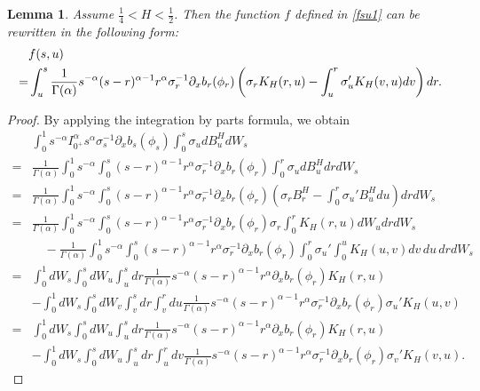 \documentclass[preprint,12pt]{elsarticle}
\newtheorem{lemma}[theorem]{Lemma}
\theoremstyle{definition}  %
\theoremstyle{plain}  %
\begin{document}
\begin{lemma}
 Assume $\tfrac{1}{4} < H < \tfrac{1}{2}$. Then the function $f$ defined in \eqref{fsu1} can be rewritten in the following form:
 \begin{align}
  \notag    &f(s,u)\\
      =&\int_u^s  \frac{1}{\Gamma(\alpha)} s^{-\alpha}  (s-r)^{\alpha-1} r^{\alpha} \sigma_r^{-1}\partial_x b_r(\phi_r)\left( \sigma_r  K_H(r,u) -\int_u^r \sigma_u' K_H(v,u)dv   \right)dr. \label{fsu}
 \end{align}
\end{lemma}
\begin{proof}
 By applying the integration by parts formula, we obtain
  \begin{align*}
    & \int_0^1 s^{-\alpha}I_{0^+}^\alpha s^{\alpha} \sigma_s^{-1}\partial_x b_s(\phi_s)\int_0^s \sigma_u dB^H_u    dW_s  \\
      =& \frac{1}{\Gamma(\alpha)}\int_0^1 s^{-\alpha} \int_0^s (s-r)^{\alpha-1} r^{\alpha} \sigma_r^{-1}\partial_x b_r(\phi_r)\int_0^r \sigma_u dB^H_u  dr dW_s \\
      =& \frac{1}{\Gamma(\alpha)}\int_0^1 s^{-\alpha} \int_0^s (s-r)^{\alpha-1} r^{\alpha} \sigma_r^{-1}\partial_x b_r(\phi_r)\left( \sigma_r B^H_r-\int_0^r \sigma_u' B^H_u du\right) drdW_s\\
       =& \frac{1}{\Gamma(\alpha)}\int_0^1 s^{-\alpha} \int_0^s (s-r)^{\alpha-1} r^{\alpha} \sigma_r^{-1}\partial_x b_r(\phi_r) \sigma_r \int_0^r K_H(r,u)dW_u drdW_s\\
       &\quad  - \frac{1}{\Gamma(\alpha)}\int_0^1 s^{-\alpha} \int_0^s (s-r)^{\alpha-1} r^{\alpha} \sigma_r^{-1}\partial_x b_r(\phi_r) \int_0^r \sigma_u'\int_0^u K_H(u,v)dv\,du\,drdW_s\\
       =&\int_0^1 dW_s\int_0^s dW_u \int_u^s dr  \frac{1}{\Gamma(\alpha)} s^{-\alpha}  (s-r)^{\alpha-1} r^{\alpha} \partial_x b_r(\phi_r)   K_H(r,u)\\
       &-\int_0^1 dW_s\int_0^s dW_v \int_v^s dr \int_v^r du
       \frac{1}{\Gamma(\alpha)} s^{-\alpha}  (s-r)^{\alpha-1} r^{\alpha} \sigma_r^{-1}\partial_x b_r(\phi_r) \sigma_u' K_H(u,v)\\
        =&\int_0^1 dW_s\int_0^s dW_u \int_u^s dr  \frac{1}{\Gamma(\alpha)} s^{-\alpha}  (s-r)^{\alpha-1} r^{\alpha} \partial_x b_r(\phi_r)  K_H(r,u)\\
       &-\int_0^1 dW_s\int_0^s dW_u \int_u^s dr \int_u^r dv
       \frac{1}{\Gamma(\alpha)} s^{-\alpha}  (s-r)^{\alpha-1} r^{\alpha} \sigma_r^{-1}\partial_x b_r(\phi_r) \sigma_v' K_H(v,u).

\end{align*}
\end{proof}
\end{document}
